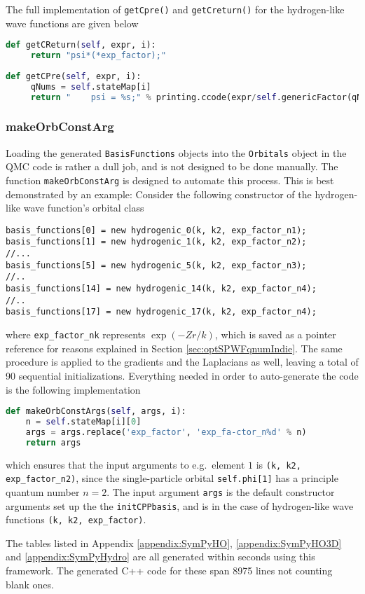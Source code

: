 The full implementation of \verb+getCpre()+ and \verb+getCreturn()+ for the hydrogen-like wave functions are given below

\vspace{0.5cm}
\begin{lstlisting}[language=Python, otherkeywords={self}]
def getCReturn(self, expr, i):
     return "psi*(*exp_factor);" 
     
def getCPre(self, expr, i):
     qNums = self.stateMap[i]
     return "    psi = %s;" % printing.ccode(expr/self.genericFactor(qNums))
\end{lstlisting}



\subsubsection{makeOrbConstArg}

Loading the generated \verb+BasisFunctions+ objects into the \verb+Orbitals+ object in the QMC code is rather a dull job, and is not designed to be done manually. The function \verb+makeOrbConstArg+ is designed to automate this process. This is best demonstrated by an example: Consider the following constructor of the hydrogen-like wave function's orbital class

\vspace{0.5cm}
\begin{lstlisting}
basis_functions[0] = new hydrogenic_0(k, k2, exp_factor_n1);
basis_functions[1] = new hydrogenic_1(k, k2, exp_factor_n2);
//...
basis_functions[5] = new hydrogenic_5(k, k2, exp_factor_n3);
//..
basis_functions[14] = new hydrogenic_14(k, k2, exp_factor_n4);
//..
basis_functions[17] = new hydrogenic_17(k, k2, exp_factor_n4);
\end{lstlisting}

where \verb+exp_factor_nk+ represents $\exp(-Zr/k)$, which is saved as a pointer reference for reasons explained in Section \ref{sec:optSPWFqnumIndie}. The same procedure is applied to the gradients and the Laplacians as well, leaving a total of 90 sequential initializations. Everything needed in order to auto-generate the code is the following implementation

\vspace{0.5cm}
\begin{lstlisting}[language=Python, otherkeywords={self}]
def makeOrbConstArgs(self, args, i):
    n = self.stateMap[i][0]
    args = args.replace('exp_factor', 'exp_fa-ctor_n%d' % n)
    return args
\end{lstlisting}

which ensures that the input arguments to e.g.~element $1$ is \verb+(k, k2, exp_factor_n2)+, since the single-particle orbital \verb+self.phi[1]+ has a principle quantum number $n=2$. The input argument \verb+args+ is the default constructor arguments set up the the \verb+initCPPbasis+, and is in the case of hydrogen-like wave functions \verb+(k, k2, exp_factor)+.

The tables listed in Appendix \ref{appendix:SymPyHO}, \ref{appendix:SymPyHO3D} and \ref{appendix:SymPyHydro} are all generated within seconds using this framework. The generated C++ code for these span 8975 lines not counting blank ones.